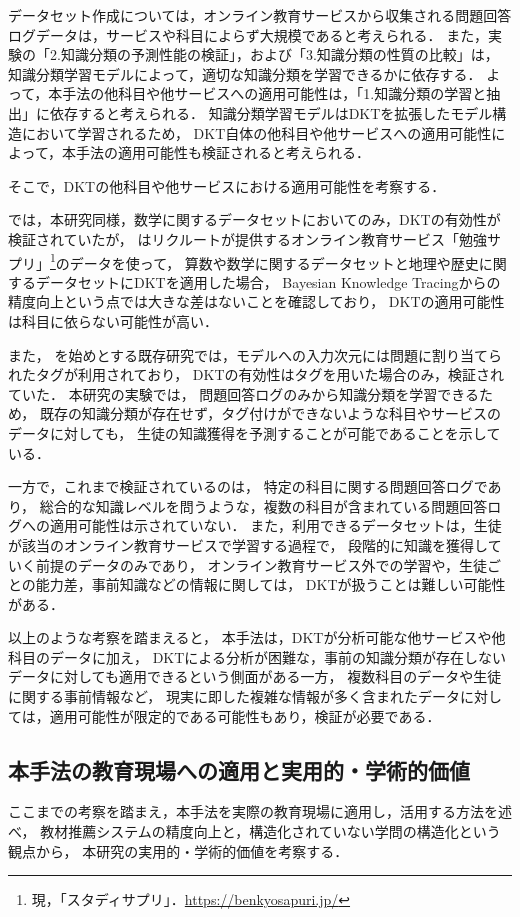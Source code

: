 データセット作成については，オンライン教育サービスから収集される問題回答ログデータは，サービスや科目によらず大規模であると考えられる．
また，実験の「2.知識分類の予測性能の検証」，および「3.知識分類の性質の比較」は，
知識分類学習モデルによって，適切な知識分類を学習できるかに依存する．
よって，本手法の他科目や他サービスへの適用可能性は，「1.知識分類の学習と抽出」に依存すると考えられる．
知識分類学習モデルはDKTを拡張したモデル構造において学習されるため，
DKT自体の他科目や他サービスへの適用可能性によって，本手法の適用可能性も検証されると考えられる．


そこで，DKTの他科目や他サービスにおける適用可能性を考察する．

\cite{piech2015deep}では，本研究同様，数学に関するデータセットにおいてのみ，DKTの有効性が検証されていたが，
\cite{nasuno2016深層学習}はリクルートが提供するオンライン教育サービス「勉強サプリ」\footnote{現，「スタディサプリ」．\url{https://benkyosapuri.jp/}}のデータを使って，
算数や数学に関するデータセットと地理や歴史に関するデータセットにDKTを適用した場合，
Bayesian Knowledge Tracingからの精度向上という点では大きな差はないことを確認しており，
DKTの適用可能性は科目に依らない可能性が高い．

また，
\cite{piech2015deep}を始めとする既存研究では，モデルへの入力次元には問題に割り当てられたタグが利用されており，
DKTの有効性はタグを用いた場合のみ，検証されていた．
本研究の実験では，
問題回答ログのみから知識分類を学習できるため，
既存の知識分類が存在せず，タグ付けができないような科目やサービスのデータに対しても，
生徒の知識獲得を予測することが可能であることを示している．


一方で，これまで検証されているのは，
特定の科目に関する問題回答ログであり，
総合的な知識レベルを問うような，複数の科目が含まれている問題回答ログへの適用可能性は示されていない．
また，利用できるデータセットは，生徒が該当のオンライン教育サービスで学習する過程で，
段階的に知識を獲得していく前提のデータのみであり，
オンライン教育サービス外での学習や，生徒ごとの能力差，事前知識などの情報に関しては，
DKTが扱うことは難しい可能性がある．


以上のような考察を踏まえると，
本手法は，DKTが分析可能な他サービスや他科目のデータに加え，
DKTによる分析が困難な，事前の知識分類が存在しないデータに対しても適用できるという側面がある一方，
複数科目のデータや生徒に関する事前情報など，
現実に即した複雑な情報が多く含まれたデータに対しては，適用可能性が限定的である可能性もあり，検証が必要である．


\subsection{本手法の教育現場への適用と実用的・学術的価値}
ここまでの考察を踏まえ，本手法を実際の教育現場に適用し，活用する方法を述べ，
教材推薦システムの精度向上と，構造化されていない学問の構造化という観点から，
本研究の実用的・学術的価値を考察する．


